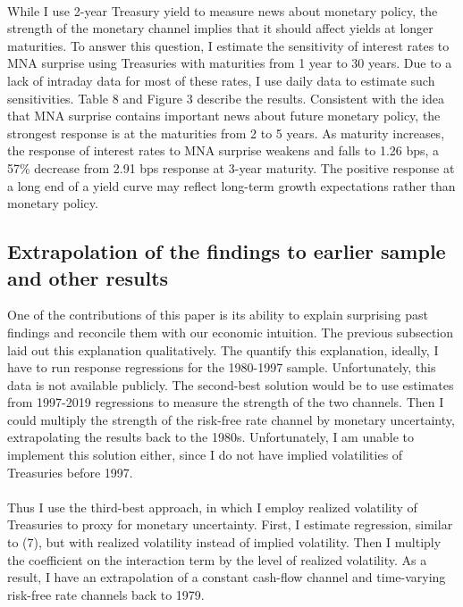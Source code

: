 \documentclass[12pt]{article}
\begin{document}
\paragraph{}
While I use 2-year Treasury yield to measure news about monetary policy, the strength of the monetary channel implies that it should affect yields at longer maturities. To answer this question, I estimate the sensitivity of interest rates to MNA surprise using Treasuries with maturities from 1 year to 30 years. Due to a lack of intraday data for most of these rates, I use daily data to estimate such sensitivities. Table 8 and Figure 3 describe the results. Consistent with the idea that MNA surprise contains important news about future monetary policy, the strongest response is at the maturities from 2 to 5 years. As maturity increases, the response of interest rates to MNA surprise weakens and falls to 1.26 bps, a 57\% decrease from 2.91 bps response at 3-year maturity. The positive response at a long end of a yield curve may reflect long-term growth expectations rather than monetary policy. 

\subsection{Extrapolation of the findings to earlier sample and other results} \label{sec:Model}

One of the contributions of this paper is its ability to explain surprising past findings and reconcile them with our economic intuition. The previous subsection laid out this explanation qualitatively. The quantify this explanation, ideally, I have to run response regressions for the 1980-1997 sample. Unfortunately, this data is not available publicly. The second-best solution would be to use estimates from 1997-2019 regressions to measure the strength of the two channels. Then I could multiply the strength of the risk-free rate channel by monetary uncertainty, extrapolating the results back to the 1980s. Unfortunately, I am unable to implement this solution either, since I do not have implied volatilities of Treasuries before 1997.
\paragraph{}
Thus I use the third-best approach, in which I employ realized volatility of Treasuries to proxy for monetary uncertainty. First, I estimate regression, similar to (7), but with realized volatility instead of implied volatility. Then I multiply the coefficient on the interaction term by the level of realized volatility. As a result, I have an extrapolation of a constant cash-flow channel and time-varying risk-free rate channels back to 1979.
\end{document}
